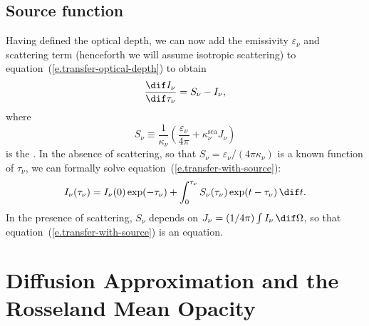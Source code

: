 \subsection{Source function}

Having defined the optical depth, we can now add the emissivity $\varepsilon_{\nu}$ and scattering term (henceforth we will assume isotropic scattering) to equation~(\ref{e.transfer-optical-depth}) to obtain
\begin{equation}\label{e.transfer-with-source}
\frac{\dif I_{\nu}}{\dif \tau_{\nu}} = S_{\nu}-I_{\nu},
\end{equation}
where 
\begin{equation}\label{e.source-fcn-def}
S_{\nu} \equiv \frac{1}{\kappa_{\nu}}\left(\frac{\varepsilon_{\nu}}{4\pi} + \kappa_{\nu}^{\mathrm{sca}}J_{\nu}\right)
\end{equation}
is the . In the absence of scattering, so that $S_{\nu} = \varepsilon_{\nu}/(4\pi\kappa_{\nu})$ is a known function of $\tau_{\nu}$,
we can formally solve equation~(\ref{e.transfer-with-source}):
\[ I_{\nu}(\tau_{\nu}) = I_{\nu}(0)\exp(-\tau_{\nu}) + \int_{0}^{\tau_{\nu}} S_{\nu}(\tau_{\nu}) \exp(t-\tau_{\nu})\,\dif t. \]
In the presence of scattering, $S_{\nu}$ depends on $J_{\nu} = (1/4\pi)\int I_{\nu}\,\dif\Omega$, so that equation~(\ref{e.transfer-with-source}) is an  equation.

\section[Diffusion Approximation]{Diffusion Approximation and the Rosseland Mean Opacity}

